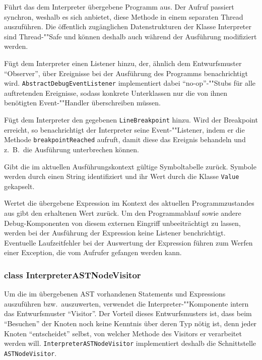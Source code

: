 \begin{description}

    Führt das dem Interpreter übergebene Programm aus. Der Aufruf passiert synchron, weshalb es sich anbietet, diese Methode in einem separaten Thread auszuführen. Die öffentlich zugänglichen Datenstrukturen der Klasse Interpreter sind Thread-""Safe und können deshalb auch während der Ausführung modifiziert werden.

    Fügt dem Interpreter einen Listener hinzu, der, ähnlich dem Entwurfsmuster ``Observer'', über Ereignisse bei der Ausführung des Programms benachrichtigt wird. \texttt{AbstractDebugEventListener} implementiert dabei ``no-op''-""Stubs für alle auftretenden Ereignisse, sodass konkrete Unterklassen nur die von ihnen benötigten Event-""Handler überschreiben müssen.

    Fügt dem Interpreter den gegebenen \texttt{LineBreakpoint} hinzu. Wird der Breakpoint erreicht, so benachrichtigt der Interpreter seine Event-""Listener, indem er die Methode \texttt{breakpointReached} aufruft, damit diese das Ereignis behandeln und z.~B.\ die Ausführung unterbrechen können.

     Gibt die im aktuellen Ausführungskontext gültige Symboltabelle zurück. Symbole werden durch einen String identifiziert und ihr Wert durch die Klasse \texttt{Value} gekapselt.

    Wertet die übergebene Expression im Kontext des aktuellen Programmzustandes aus gibt den erhaltenen Wert zurück. Um den Programmablauf sowie andere Debug-Komponenten von diesem externen Eingriff unbeeiträchtigt zu lassen, werden bei der Ausführung der Expression keine Listener benchrichtigt. Eventuelle Laufzeitfehler bei der Auswertung der Expression führen zum Werfen einer Exception, die vom Aufrufer gefangen werden kann.
\end{description}

\subsubsection{class InterpreterASTNodeVisitor}
Um die im übergebenen AST vorhandenen Statements und Expressions auszuführen bzw.\ auszuwerten, verwendet die Interpreter-""Komponente intern das Entwurfsmuster ``Visitor''. Der Vorteil dieses Entwurfsmusters ist, dass beim ``Besuchen'' der Knoten noch keine Kenntnis über deren Typ nötig ist, denn jeder Knoten ``entscheidet'' selbst, von welcher Methode des Visitors er verarbeitet werden will. \texttt{InterpreterASTNodeVisitor} implementiert deshalb die Schnittstelle \texttt{ASTNodeVisitor}.


